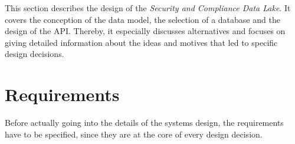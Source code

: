 
This section describes the design of the \textit{Security and Compliance Data Lake}. It covers the conception of the data model, the selection of a database and the design of the API. Thereby, it especially discusses alternatives and focuses on giving detailed information about the ideas and motives that led to specific design decisions.

\section{Requirements}
Before actually going into the details of the systems design, the requirements have to be specified, since they are at the core of every design decision.  

